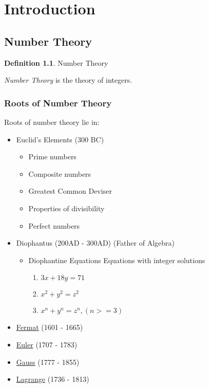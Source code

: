 \documentclass[fleqn,letterpaper,10pt,twoside]{report}
\newcounter{example}
\theoremstyle{plain}
\theoremstyle{definition}
\newtheorem{definition}{Definition}[section]
\theoremstyle{remark}
\begin{document}
\pagestyle{fancy}

\renewcommand{\chaptermark}[1]{\markboth{\chaptername \ \thechapter.\ #1}{}} 
\renewcommand{\sectionmark}[1]{\markright{\thesection.\ #1}{}}
\fancyhead[LE,RO]{\sffamily\bfseries \rightmark}
\fancyhead[LO,RE]{\sffamily\bfseries \leftmark}

\setcounter{chapter}{0}
\setcounter{definition}{1}
\setcounter{example}{1}

\chapter{Introduction}
\section{Number Theory}

\begin{definition}{Number Theory}

   \textit{Number Theory} is the theory of integers.
\end{definition}

\subsection{Roots of Number Theory}
Roots of number theory lie in:
\begin{itemize}
   \item{Euclid's Elements (300 BC)}
      \begin{itemize}
         \item{Prime numbers}
         \item{Composite numbers}
         \item{Greatest Common Deviser}
         \item{Properties of divisibility}
         \item{Perfect numbers}
      \end{itemize}
   \item{Diophantus (200AD - 300AD) (Father of Algebra)}
      \begin{itemize}
         \item{Diophantine Equations}
            Equations with integer solutions
            \begin{enumerate}
               \item{\(3x + 18y = 71\)}
               \item{\(x^2 + y^2 = z^2\)}
               \item{\(x^n + y^n = z^n, (n >= 3)\)}
            \end{enumerate}
      \end{itemize}
   \item{\href{https://en.wikipedia.org/wiki/Pierre\_de\_Fermat}{Fermat} (1601 - 1665)}
   \item{\href{https://en.wikipedia.org/wiki/Leonhard\_Euler}{Euler} (1707 - 1783)}
   \item{\href{https://en.wikipedia.org/wiki/Carl\_Friedrich\_Gauss}{Gauss} (1777 - 1855)}
   \item{\href{https://en.wikipedia.org/wiki/Joseph-Louis\_Lagrange}{Lagrange} (1736 - 1813)}
\end{itemize}
\end{document}
